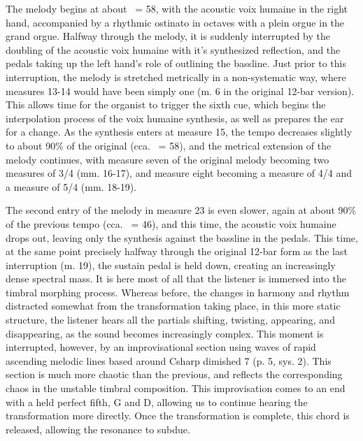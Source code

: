 \documentclass[12pt,twoside,maitrise]{dms_ks}
\theoremstyle{definition}
\begin{document}
The melody begins at about \musQuarter\ = 58, with the acoustic voix humaine in the right hand, accompanied by a rhythmic ostinato in octaves with a plein orgue in the grand orgue. 
Halfway through the melody, it is suddenly interrupted by the doubling of the acoustic voix humaine with it's synthesized reflection, and the pedals taking up the left hand's role of outlining the bassline. 
Just prior to this interruption, the melody is stretched metrically in a non-systematic way, where measures 13-14 would have been simply one (m. 6 in the original 12-bar version). 
This allows time for the organist to trigger the sixth cue, which begins the interpolation process of the voix humaine synthesis, as well as prepares the ear for a change. 
As the synthesis enters at measure 15, the tempo decreases slightly to about 90\% of the original (cca. \musQuarter\ = 58), and the metrical extension of the melody continues, with measure seven of the original melody becoming two measures of 3/4 (mm. 16-17), and measure eight becoming a measure of 4/4 and a measure of 5/4 (mm. 18-19). 

The second entry of the melody in measure 23 is even slower, again at about 90\% of the previous tempo (cca. 
\musQuarter\ = 46), and this time, the acoustic voix humaine drops out, leaving only the synthesis against the bassline in the pedals. 
This time, at the same point precisely halfway through the original 12-bar form as the last interruption (m. 
19), the sustain pedal is held down, creating an increasingly dense spectral mass. 
It is here most of all that the listener is immersed into the timbral morphing process. 
Whereas before, the changes in harmony and rhythm distracted somewhat from the transformation taking place, in this more static structure, the listener hears all the partials shifting, twisting, appearing, and disappearing, as the sound becomes increasingly complex. 
This moment is interrupted, however, by an improvisational section using waves of rapid ascending melodic lines based around Csharp dimished 7 (p. 5, sys. 2). 
This section is much more chaotic than the previous, and reflects the corresponding chaos in the unstable timbral composition. 
This improvisation comes to an end with a held perfect fifth, G and D, allowing us to continue hearing the transformation more directly. 
Once the transformation is complete, this chord is released, allowing the resonance to subdue. 
\end{document}
